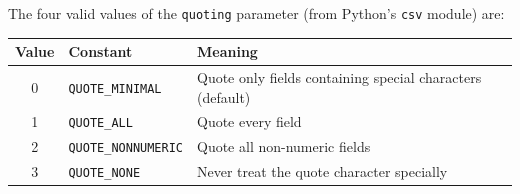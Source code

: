 \documentclass[11pt]{article}
\begin{document}
The four valid values of the \texttt{quoting} parameter (from Python's
\texttt{csv} module) are:
\begin{center}
\begin{tabular}{@{}cll@{}}
\toprule
Value & Constant & Meaning \\
\midrule
0 & \texttt{QUOTE\_MINIMAL} & Quote only fields containing special characters (default) \\
1 & \texttt{QUOTE\_ALL} & Quote every field \\
2 & \texttt{QUOTE\_NONNUMERIC} & Quote all non-numeric fields \\
3 & \texttt{QUOTE\_NONE} & Never treat the quote character specially \\
\bottomrule
\end{tabular}
\end{center}
\end{document}
